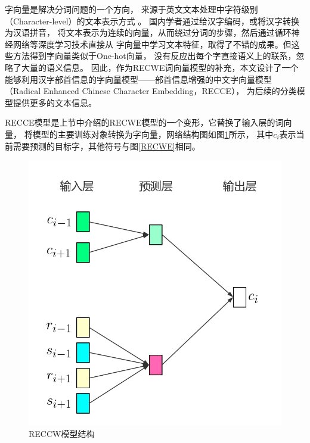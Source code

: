 字向量是解决分词问题的一个方向，
来源于英文文本处理中字符级别（Character-level）的文本表示方式
。
国内学者通过给汉字编码，或将汉字转换为汉语拼音，
将文本表示为连续的向量，从而绕过分词的步骤，然后通过循环神经网络等深度学习技术直接从
字向量中学习文本特征，取得了不错的成果。但这些方法得到字向量类似于One-hot向量，
没有反应出每个字直接语义上的联系，忽略了大量的语义信息。
因此，作为RECWE词向量模型的补充，本文设计了一个能够利用汉字部首信息的字向量模型——部首信息增强的中文字向量模型（Radical Enhanced Chinese Character Embedding，RECCE），
为后续的分类模型提供更多的文本信息。

RECCE模型是上节中介绍的RECWE模型的一个变形，它替换了输入层的词向量，
将模型的主要训练对象转换为字向量，网络结构图如图\ref{RECCE}所示，
其中$c_i$表示当前需要预测的目标字，其他符号与图\ref{RECWE}相同。
\begin{figure}
    \includegraphics[scale=0.4]{picture/RECCE.png}
    \caption{RECCW模型结构}
    \label{RECCE}
\end{figure}

